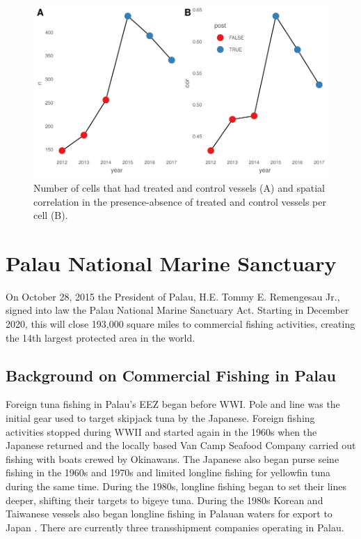 \documentclass[11pt,english]{article}
\begin{document}
\begin{figure}
\centering
\includegraphics{Manuscript_files/figure-latex/unnamed-chunk-17-1.pdf}
\caption{\label{fig:unnamed-chunk-17}\label{fig:sp_corr}Number of cells that
had treated and control vessels (A) and spatial correlation in the
presence-absence of treated and control vessels per cell (B).}
\end{figure}

\clearpage

\section{Palau National Marine Sanctuary}\label{PNMS}


On October 28, 2015 the President of Palau, H.E. Tommy E. Remengesau Jr., signed into law the Palau National Marine Sanctuary Act. Starting in December 2020, this will close 193,000 square miles to commercial fishing activities, creating the 14th largest protected area in the world. 

\subsection{Background on Commercial Fishing in Palau}\label{Palau_back}

Foreign tuna fishing in Palau’s EEZ began before WWI. Pole and line was the initial gear used to target skipjack tuna by the Japanese. Foreign fishing activities stopped during WWII and started again in the 1960s when the Japanese returned and the locally based Van Camp Seafood Company carried out fishing with boats crewed by Okinawans. The Japanese also began purse seine fishing in the 1960s and 1970s and limited longline fishing for yellowfin tuna during the same time. During the 1980s, longline fishing began to set their lines deeper, shifting their targets to bigeye tuna. During the 1980s Korean and Taiwanese vessels also began longline fishing in Palauan waters for export to Japan \citep{chapman2000development}. There are currently three transshipment companies operating in Palau.
\end{document}
